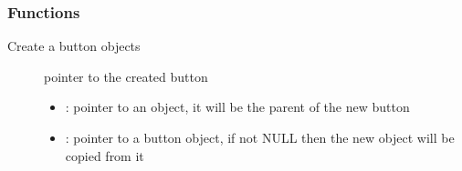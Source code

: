 \documentclass[letterpaper,10pt,english]{sphinxmanual}
\begin{document}
\begin{fulllineitems}

\begin{fulllineitems}
\label{\detokenize{object-types/btn:_CPPv416LV_BTN_STYLE_INA}}%
\pysigstartmultiline
{}%
\pysigstopmultiline
\end{fulllineitems}


\end{fulllineitems}

\subsubsection*{Functions}

\begin{fulllineitems}
\label{\detokenize{object-types/btn:_CPPv413lv_btn_createP8lv_obj_tPK8lv_obj_t}}%
\pysigstartmultiline
{}\label{\detokenize{object-types/btn:lv__btn_8h_1a9019f4e861e31cd369b433b9d2a2fc0c}}%
\pysigstopmultiline
Create a button objects \begin{description}
\item[{}] \leavevmode
pointer to the created button 

\item[{}] \leavevmode\begin{itemize}
\item {} 
: pointer to an object, it will be the parent of the new button 

\item {} 
: pointer to a button object, if not NULL then the new object will be copied from it 

\end{itemize}

\end{description}


\end{fulllineitems}
\end{document}
